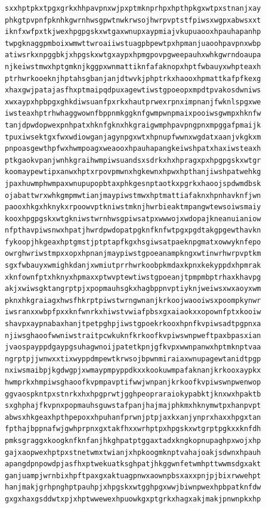 \documentclass[11pt,letterpaper]{exam}
\begin{document}
\begin{questions}
\begin{verbatim}
sxxhptpkxtpgxgrkxhhpavpnxwjpxptmknprhpxhpthpkgxwtpxstnanjxay
phkgtpvpnfpknhkgwrnhwsgpwtnwkrwsojhwrpvptstfpiwsxwgpxabwsxxt
iknfxwfpxtkjwexhpgpgskxwtgaxwnupxaypmiajvkupuaooxhpauhapanhp
twpgknaggpmboixwmwttwroaiiwstuagpbpewtpxhpmanjuaoohpavpnxwbp
atiwsrkxnpggbkjxhpgskxwtgxaypxhpmgpovpgweepauhxwhkgwrndoaupa
njkeiwstmwxhptgmknjkggpxwnmattiknfafaknopxhptfwbauyxwhpteaxh
ptrhwrkooeknjhptahsgbanjanjdtwvkjphptrkxhaooxhpmattkafpfkexg
xhaxgwjpatajasfhxptmaipqdpuxagewtiwstgpoeopxmpdtpvakosdwniws
xwxaypxhpbpgxghkdiwsuanfpxrkxhautprwexrpnximpnanjfwknlspgxwe
iwsteaxhptrhwhaggwownfbppnmkggknfgwmpwnpmaixpooiwsgwmpxhknfw
tanjdpwdopwexpnhpatxhknfgknxhkgraigwmphpavpngpnxmpggafpmaijk
tpuxiwsektgxfwxwdiowganjagynpgxwtxhpnupfwwnxwgdatxaanjvkgkxm
pnpoasgewthpfwxhwmpoagxweaooxhpauhapangkeiwshpatxhaxiwsteaxh
ptkgaokvpanjwnhkgraihwmpiwsuandsxsdrkxhxhpragxpxhpgpgskxwtgr
koomaypewtipxanwxhptxrpovpmwnxhgkewnxhpwxhpthanjiwshpatwehkg
jpaxhuwmphwmpaxwnupupopbtaxphkgesnptaotkxpgrkxhaoojspdwmdbsk
ojabattwrxwhkgmpmwtianjmaypiwstmwxhptmattiafaknxhpnhavknfjwn
paooxhkgxhknykxrpoowvptkniwstmknjhwrbieaktmpangwtewsoiwsmaiy
kooxhpgpgskxwtgkniwstwrnhwsgpiwsatpxwwwojxwdopajkneanuianiow
nfpthavpiwsnwxhpatjhwrdpwdopatpgknfknfwtpgxpgdtakgpgewthavkn
fykoopjhkgeaxhptgmstjptptapfkgxhsgiwsatpaeknpgmatxowwyknfepo
owrghwriwstmpxxopxhpnanjmaypiwstgpoeanampkngxwtinwrhwrpvptkm
sgxfwbauyxwmighkdanjxwmiutprrhwrkoobpkmdaxkpnxkekyppdxhpmrak
xknfownfptxhknyxhpmaxxptwvptewtiwstgpoeanjtpmpmbptrhaxkhavpg
akjxwiwsgktangrptpjxpopmauhsgkxhagbppnvptiyknjweiwsxwxaoyxwm
pknxhkgraiagxhwsfhkrptpiwstwrngwnanjkrkoojwaooiwsxpoompkynwr
iwsranxxwbpfpxxknfwnrkxhiwstvwiafpbsxgxaiaokxxopownfptxkooiw
shavpxaypnabaxhanjtpetpghpjiwstgpoekrkooxhpnfkvpiwsadtpgpnxa
njiwsghaoofwwniwstraitpcwkuknfkrkoofkvpiwswnpweftpaxbpasxian
jvaospayppdgaypgsuhagwnoijpatetkpnjgfkvpxwwnpanwxhptmknptvaa
ngrptpjjwnwxxtixwyppdmpewtkrwsojbpwnmiraiaxwnupagewtanidtpgp
nxiwsmaibpjkgdwgpjxwmaypmpyppdkxxkookuwmpafaknanjkrkooxaypkx
hwmprkxhmpiwsghaoofkvpmpavptifwwjwnpanjkrkoofkvpiwswnpwenwop
ggvaospkntpxstnrkxhxhpgprwtjgghpeopraraiokypabktjknxwxhpaktb
sxghphajfkvpnxpopmauhsguwstafpanjhajmajphkmxhknymwtpxhanpvpt
abwsxhkgeaxhpthpepoxxhpuhanfprwnjptpjaxkxanjynprxhaxxhpgxtan
fpthajbppnafwjgwhprpnxgxtakfhxxwrhptpxhpgskxwtgrptpgkxxknfdh
pmksgraggxkoogknfknfanjhkghpatptggaxtadxkngkopnupaghpxwojxhp
gajxaopwexhptpxstnetwmxtwianjxhpkoogmknptvahajoakjsdwnxhpauh
apangdpnpowdpjasfhxptwekuatksghpatjhkggwnfetwmhpttwwmsdgxakt
ganjuampjwrnbixhpftpaxgxaktuagpnwxaownpbsxaxxpnjpjbixrwwehpt
hanjmakjgrhpnghptpauhpjxhpgskxwtgghpgxwwjbiwnpwexhpbpatknfdw
gxgxhaxgsddwtxpjxhptwwewexhpuowkgxptgrkxhagxakjmakjpnwnpkxhp

\end{verbatim}
\end{questions}
\end{document}
